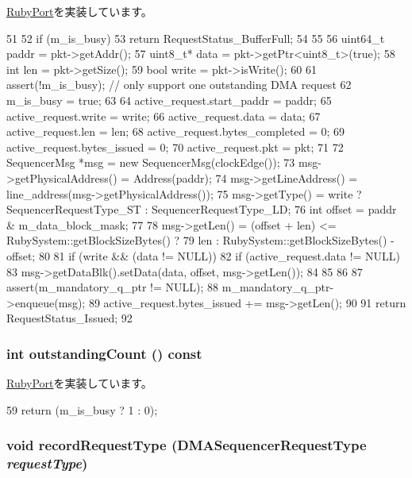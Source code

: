 \hyperlink{classRubyPort_a596adbddbc1059f06e3989f743f2ed3e}{RubyPort}を実装しています。


\begin{DoxyCode}
51 {
52     if (m_is_busy) {
53         return RequestStatus_BufferFull;
54     }
55 
56     uint64_t paddr = pkt->getAddr();
57     uint8_t* data =  pkt->getPtr<uint8_t>(true);
58     int len = pkt->getSize();
59     bool write = pkt->isWrite();
60 
61     assert(!m_is_busy);  // only support one outstanding DMA request
62     m_is_busy = true;
63 
64     active_request.start_paddr = paddr;
65     active_request.write = write;
66     active_request.data = data;
67     active_request.len = len;
68     active_request.bytes_completed = 0;
69     active_request.bytes_issued = 0;
70     active_request.pkt = pkt;
71 
72     SequencerMsg *msg = new SequencerMsg(clockEdge());
73     msg->getPhysicalAddress() = Address(paddr);
74     msg->getLineAddress() = line_address(msg->getPhysicalAddress());
75     msg->getType() = write ? SequencerRequestType_ST : SequencerRequestType_LD;
76     int offset = paddr & m_data_block_mask;
77 
78     msg->getLen() = (offset + len) <= RubySystem::getBlockSizeBytes() ?
79         len : RubySystem::getBlockSizeBytes() - offset;
80 
81     if (write && (data != NULL)) {
82         if (active_request.data != NULL) {
83             msg->getDataBlk().setData(data, offset, msg->getLen());
84         }
85     }
86 
87     assert(m_mandatory_q_ptr != NULL);
88     m_mandatory_q_ptr->enqueue(msg);
89     active_request.bytes_issued += msg->getLen();
90 
91     return RequestStatus_Issued;
92 }
\end{DoxyCode}
\hypertarget{classDMASequencer_ae47593dc86baa86bf047ad1fbcdcceed}{
\subsubsection[{outstandingCount}]{\setlength{\rightskip}{0pt plus 5cm}int outstandingCount () const}}
\label{classDMASequencer_ae47593dc86baa86bf047ad1fbcdcceed}


\hyperlink{classRubyPort_a366b0b3d8b8a08b7066f1b98c1b40b85}{RubyPort}を実装しています。


\begin{DoxyCode}
59 { return (m_is_busy ? 1 : 0); }
\end{DoxyCode}
\hypertarget{classDMASequencer_a6a9c711db98e308367905995bf8ab52c}{
\subsubsection[{recordRequestType}]{\setlength{\rightskip}{0pt plus 5cm}void recordRequestType (DMASequencerRequestType {\em requestType})}}
\label{classDMASequencer_a6a9c711db98e308367905995bf8ab52c}



